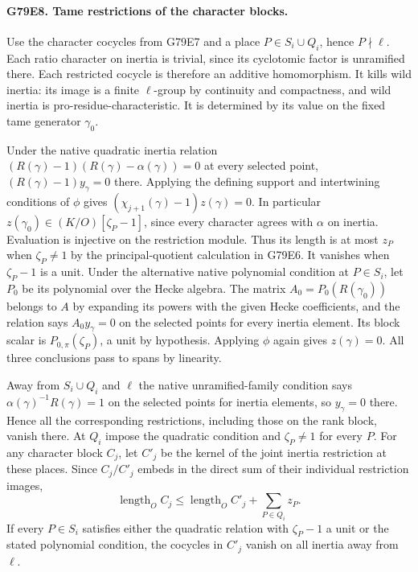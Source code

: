 \paragraph{G79E8. Tame restrictions of the character blocks.}
Use the character cocycles from G79E7 and a place
$P\in S_i\cup Q_i$, hence $P\nmid\ell$. Each ratio character on
inertia is trivial, since its cyclotomic factor is unramified
there. Each restricted cocycle is therefore an additive homomorphism.
It kills wild inertia: its image is a finite $\ell$-group by
continuity and compactness, and wild inertia is pro-residue-characteristic.
It is determined by its value on the fixed tame generator $\gamma_0$.

Under the native quadratic inertia relation
$(R(\gamma)-1)(R(\gamma)-\alpha(\gamma))=0$ at every selected
point, $(R(\gamma)-1)y_\gamma=0$ there. Applying the defining
support and intertwining conditions of $\phi$ gives
$(\chi_{j+1}(\gamma)-1) z(\gamma)=0$. In particular
$z(\gamma_0)\in(K/O)[\zeta_P-1]$, since every character agrees
with $\alpha$ on inertia. Evaluation is injective on the restriction
module. Thus its length is at most $z_P$ when $\zeta_P\ne1$ by
the principal-quotient calculation in G79E6. It vanishes when
$\zeta_P-1$ is a unit. Under the alternative native polynomial
condition at $P\in S_i$, let $P_0$ be its polynomial over the Hecke
algebra. The matrix $A_0=P_0(R(\gamma_0))$ belongs to $A$ by
expanding its powers with the given Hecke coefficients, and the
relation says $A_0 y_\gamma=0$ on the selected points for every
inertia element. Its block scalar is $P_{0,\pi}(\zeta_P)$,
a unit by hypothesis. Applying $\phi$ again gives $z(\gamma)=0$.
All three conclusions pass to spans by linearity.

Away from $S_i\cup Q_i$ and $\ell$ the native unramified-family
condition says $\alpha(\gamma)^{-1}R(\gamma)=1$ on the selected points
for inertia elements, so $y_\gamma=0$ there. Hence all the corresponding restrictions, including
those on the rank block, vanish there. At $Q_i$ impose the quadratic
condition and $\zeta_P\ne1$ for every $P$. For any character block
$C_j$, let $C'_j$ be the kernel of the joint inertia restriction
at these places. Since $C_j/C'_j$ embeds in the direct sum of
their individual restriction images,
\[
 \operatorname{length}_O C_j\le
 \operatorname{length}_O C'_j+\sum_{P\in Q_i}z_P.
\]
If every $P\in S_i$ satisfies either the quadratic relation with
$\zeta_P-1$ a unit or the stated polynomial condition, the cocycles
in $C'_j$ vanish on all inertia away from $\ell$.


